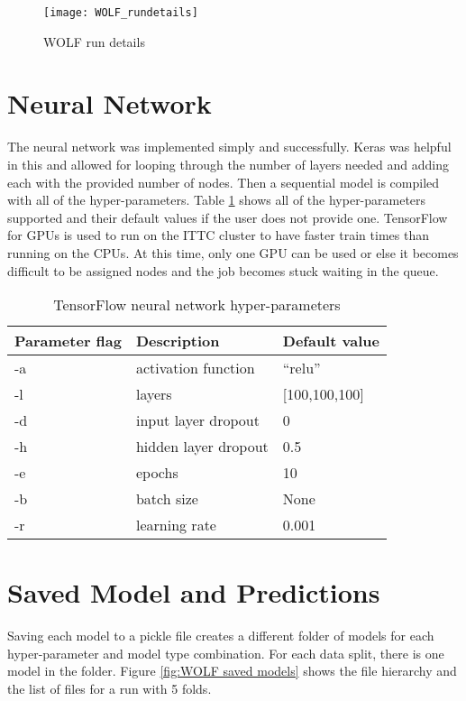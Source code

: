 \begin{figure}[H]
	\centering
	\texttt{[image: WOLF\_rundetails]}
	\caption{WOLF run details \parencite{WOLFpresentation}}
	\label{fig:WOLF website rundetails}
\end{figure}

\section*{Neural Network}
The neural network was implemented simply and successfully. Keras was helpful in this and allowed for looping through the number of layers needed and adding each with the provided number of nodes. Then a sequential model is compiled with all of the hyper-parameters. Table \ref{tab:WOLF TF HP} shows all of the hyper-parameters supported and their default values if the user does not provide one. TensorFlow for GPUs is used to run on the ITTC cluster to have faster train times than running on the CPUs. At this time, only one GPU can be used or else it becomes difficult to be assigned nodes and the job becomes stuck waiting in the queue. 
\begin{table}[H]
	\centering
	\begin{tabular}{|l|l|l|}
		\hline
		\textbf{Parameter flag} & \textbf{Description}          & \textbf{Default value}  \\ \hline
		-a             & activation function  & ``relu''       \\ \hline
		-l             & layers               & {[}100,100,100{]} \\ \hline
		-d             & input layer dropout  & 0              \\ \hline
		-h             & hidden layer dropout & 0.5              \\ \hline
		-e             & epochs               & 10             \\ \hline
		-b             & batch size           & None           \\ \hline
		-r             & learning rate        & 0.001          \\ \hline
	\end{tabular}
	\caption{TensorFlow neural network hyper-parameters}
	\label{tab:WOLF TF HP}
\end{table}

\section*{Saved Model and Predictions}
Saving each model to a pickle file creates a different folder of models for each hyper-parameter and model type combination. For each data split, there is one model in the folder. Figure \ref{fig:WOLF saved models} shows the file hierarchy and the list of files for a run with 5 folds.

